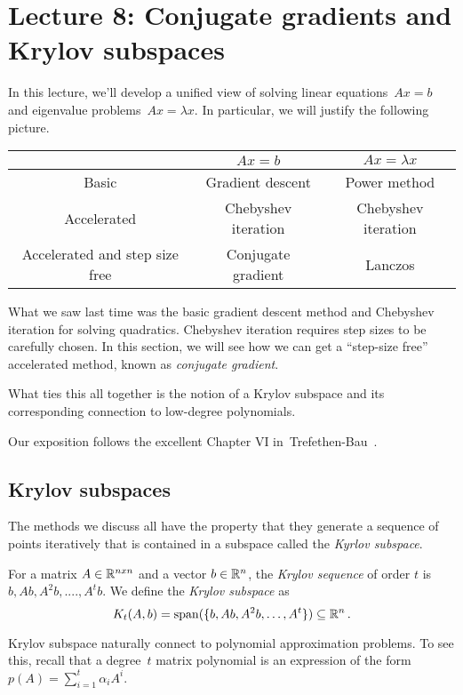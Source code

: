 
\section{Lecture 8: Conjugate gradients and Krylov subspaces}

In this lecture, we'll develop a unified view of solving linear equations~$Ax=b$
and eigenvalue problems~$Ax=\lambda x.$ In particular, we will justify the
following picture.
%
\begin{center}
\begin{tabular}{ | c |c| c | } 
\hline
 & $Ax=b$ & $Ax=\lambda x$ \\ 
\hline
Basic & Gradient descent & Power method \\ 
\hline
Accelerated & Chebyshev iteration & Chebyshev iteration \\
\hline
Accelerated and step size free & Conjugate gradient & Lanczos \\
\hline
\end{tabular}
\end{center}

What we saw last time was the basic gradient descent method and Chebyshev
iteration for solving quadratics. Chebyshev iteration requires step sizes to be
carefully chosen. In this section, we will see how we can get a ``step-size
free'' accelerated method, known as \emph{conjugate gradient}.

What ties this all together is the notion of a Krylov subspace and its
corresponding connection to low-degree polynomials.

Our exposition follows the excellent Chapter VI
in~Trefethen-Bau~\cite{trefethen97}.

\subsection{Krylov subspaces}
%
The methods we discuss all have the property that they generate a sequence of
points iteratively that is contained in a subspace called the \emph{Kyrlov
subspace}.
%
\begin{definition}
For a matrix $A \in \mathbb{R}^{n x n}$ and a vector $b \in \mathbb{R}^n$, 
the \emph{Krylov sequence} of order $t$ is $b, Ab, A^2b, ...., A^tb$. 
We define the \emph{Krylov subspace} as
\[
K_t(A,b)=\mathrm{span}(\{b, Ab, A^2b, \ldots, A^t\}) \subseteq \mathbb{R}^n\,.
\]
\end{definition}

Krylov subspace naturally connect to polynomial approximation problems.
To see this, recall that a degree~$t$ matrix polynomial is an expression of the form
$p(A)=\sum_{i=1}^t \alpha_i A^i.$ 

